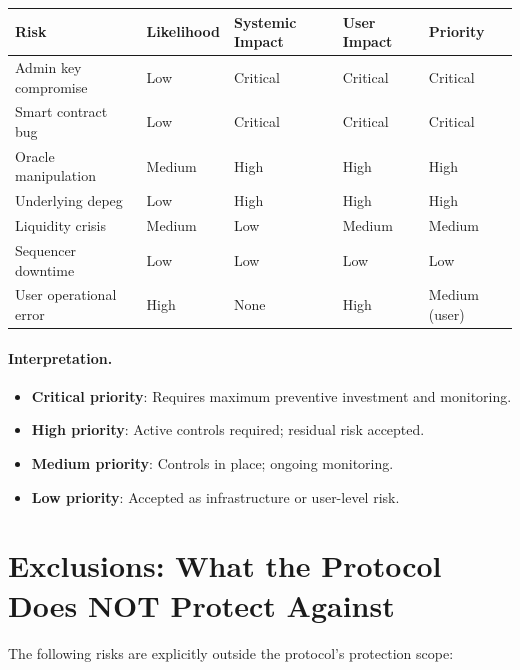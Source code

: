 \begin{center}
\begin{tabularx}{\textwidth}{l l l l l}
\toprule
\textbf{Risk} & \textbf{Likelihood} & \textbf{Systemic Impact} & \textbf{User Impact} & \textbf{Priority} \\
\midrule
Admin key compromise & Low & Critical & Critical & Critical \\
Smart contract bug & Low & Critical & Critical & Critical \\
Oracle manipulation & Medium & High & High & High \\
Underlying depeg & Low & High & High & High \\
Liquidity crisis & Medium & Low & Medium & Medium \\
Sequencer downtime & Low & Low & Low & Low \\
User operational error & High & None & High & Medium (user) \\
\bottomrule
\end{tabularx}
\end{center}

\paragraph{Interpretation.}
\begin{itemize}
\item \textbf{Critical priority}: Requires maximum preventive investment and monitoring.
\item \textbf{High priority}: Active controls required; residual risk accepted.
\item \textbf{Medium priority}: Controls in place; ongoing monitoring.
\item \textbf{Low priority}: Accepted as infrastructure or user-level risk.
\end{itemize}

\section{Exclusions: What the Protocol Does NOT Protect Against}

The following risks are explicitly outside the protocol's protection scope:

